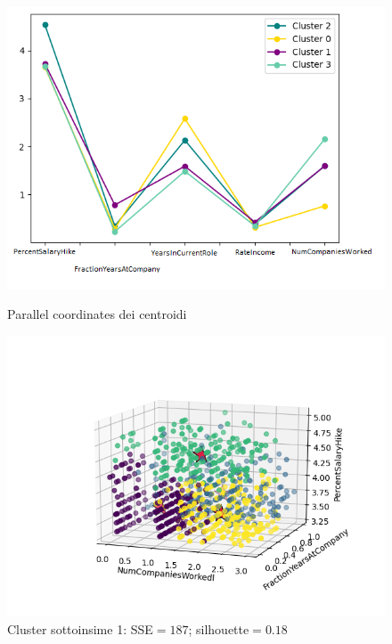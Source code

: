\documentclass[english]{article}
\begin{document}
\begin{figure}[H]
\begin{minipage}[b]{0.47\textwidth}
\centering
\includegraphics[width=\textwidth]{parallelsub1.png}
\caption{Parallel coordinates dei centroidi}
\label{etichetta1}
\end{minipage}
\hfill
\begin{minipage}[b]{0.55\textwidth}
\includegraphics[scale=0.6]{numcompan_Fraction_percentCENTROIDI.png}
\caption{Cluster sottoinsime 1: SSE$=187$; silhouette$=0.18$}
\label{etichetta2}
\end{minipage}
\end{figure}
\end{document}
